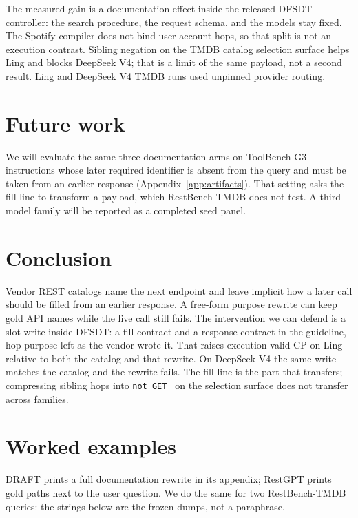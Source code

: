 \documentclass[11pt,a4paper]{article}
\begin{document}
The measured gain is a documentation effect inside the released DFSDT controller: the search procedure, the request schema, and the models stay fixed. The Spotify compiler does not bind user-account hops, so that split is not an execution contrast. Sibling negation on the TMDB catalog selection surface helps Ling and blocks DeepSeek V4; that is a limit of the same payload, not a second result. Ling and DeepSeek V4 TMDB runs used unpinned provider routing.

\section{Future work}

We will evaluate the same three documentation arms on ToolBench G3 instructions whose later required identifier is absent from the query and must be taken from an earlier response (Appendix~\ref{app:artifacts}). That setting asks the fill line to transform a payload, which RestBench-TMDB does not test. A third model family will be reported as a completed seed panel.

\section{Conclusion}

Vendor REST catalogs name the next endpoint and leave implicit how a later call should be filled from an earlier response. A free-form purpose rewrite can keep gold API names while the live call still fails. The intervention we can defend is a slot write inside DFSDT: a fill contract and a response contract in the guideline, hop purpose left as the vendor wrote it. That raises execution-valid CP on Ling relative to both the catalog and that rewrite. On DeepSeek V4 the same write matches the catalog and the rewrite fails. The fill line is the part that transfers; compressing sibling hops into \texttt{not GET\_} on the selection surface does not transfer across families.




\appendix
\section{Worked examples}
\label{app:examples}

DRAFT prints a full documentation rewrite in its appendix; RestGPT prints gold paths next to the user question. We do the same for two RestBench-TMDB queries: the strings below are the frozen dumps, not a paraphrase.
\end{document}
